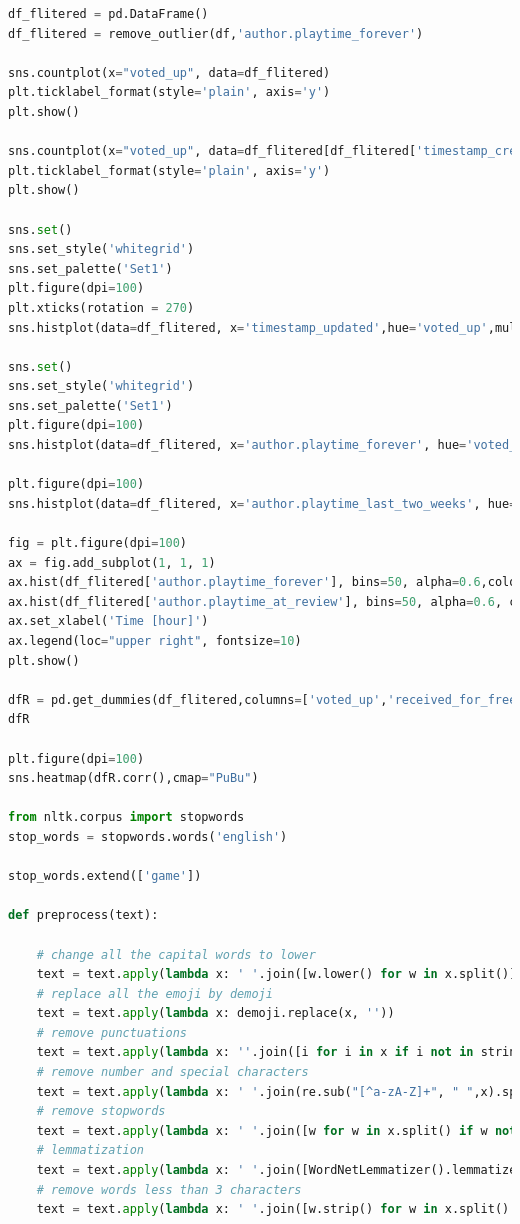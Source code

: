 \documentclass[12pt]{article}
\begin{document}
\begin{lstlisting}[language = Python]
df_flitered = pd.DataFrame()
df_flitered = remove_outlier(df,'author.playtime_forever')

sns.countplot(x="voted_up", data=df_flitered)
plt.ticklabel_format(style='plain', axis='y')
plt.show()

sns.countplot(x="voted_up", data=df_flitered[df_flitered['timestamp_created']!=df_flitered['timestamp_updated']])
plt.ticklabel_format(style='plain', axis='y')
plt.show()

sns.set()
sns.set_style('whitegrid')
sns.set_palette('Set1')
plt.figure(dpi=100)
plt.xticks(rotation = 270)
sns.histplot(data=df_flitered, x='timestamp_updated',hue='voted_up',multiple='dodge')

sns.set()
sns.set_style('whitegrid')
sns.set_palette('Set1')
plt.figure(dpi=100)
sns.histplot(data=df_flitered, x='author.playtime_forever', hue='voted_up')

plt.figure(dpi=100)
sns.histplot(data=df_flitered, x='author.playtime_last_two_weeks', hue='voted_up')

fig = plt.figure(dpi=100)
ax = fig.add_subplot(1, 1, 1)
ax.hist(df_flitered['author.playtime_forever'], bins=50, alpha=0.6,color='r',label='Playtime_forever')
ax.hist(df_flitered['author.playtime_at_review'], bins=50, alpha=0.6, color='b',label='Playtime_at_review')
ax.set_xlabel('Time [hour]')
ax.legend(loc="upper right", fontsize=10)
plt.show()

dfR = pd.get_dummies(df_flitered,columns=['voted_up','received_for_free','written_during_early_access'],drop_first=True)
dfR

plt.figure(dpi=100)
sns.heatmap(dfR.corr(),cmap="PuBu")

from nltk.corpus import stopwords
stop_words = stopwords.words('english')

stop_words.extend(['game'])

def preprocess(text):
    
    # change all the capital words to lower
    text = text.apply(lambda x: ' '.join([w.lower() for w in x.split()]))
    # replace all the emoji by demoji
    text = text.apply(lambda x: demoji.replace(x, ''))
    # remove punctuations
    text = text.apply(lambda x: ''.join([i for i in x if i not in string.punctuation]))
    # remove number and special characters
    text = text.apply(lambda x: ' '.join(re.sub("[^a-zA-Z]+", " ",x).split()))
    # remove stopwords
    text = text.apply(lambda x: ' '.join([w for w in x.split() if w not in stop_words]))
    # lemmatization
    text = text.apply(lambda x: ' '.join([WordNetLemmatizer().lemmatize(w) for w in x.split()]))
    # remove words less than 3 characters
    text = text.apply(lambda x: ' '.join([w.strip() for w in x.split() if len(w.strip()) >= 3]))
    

\end{lstlisting}
\end{document}
